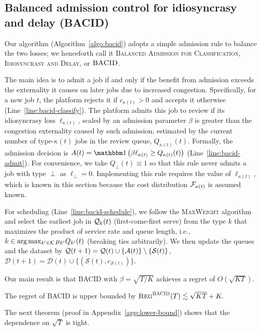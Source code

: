 \subsection{Balanced admission control for idiosyncrasy and delay (\textsc{BACID})}
Our algorithm (Algorithm~\ref{algo:bacid}) adopts a simple admission rule to balance the two losses; we henceforth call it \textsc{Balanced Admission for Classification, Idiosyncrasy and Delay}, or $\textsc{BACID}$.

The main idea is to admit a job if and only if the benefit from admission exceeds the externality it causes on later jobs due to increased congestion. Specifically, for a new job $t$, the platform rejects it if $c_{\kappa(t)} > 0$ and accepts it otherwise (Line~\ref{line:bacid-classify}). The platform admits this job to review if its idiosyncrasy loss $\ell_{\kappa(t)}$, scaled by an admission parameter $\beta$ is greater than the congestion externality caused by such admission, estimated by the current number of type-$\kappa(t)$ jobs in the review queue, $Q_{\kappa(t)}(t)$. Formally, the admission decision is $A(t) = \indic{ \beta \ell_{\kappa(t)} \geq Q_{\kappa(t)}(t)}$ (Line~\ref{line:bacid-admit}). For convenience, we take $Q_{\perp}(t) \equiv 1$ so that this rule never admits a job with type $\perp$ as $\ell_{\perp} = 0.$ Implementing this rule requires the value of $\ell_{\kappa(t)}$, which is known in this section because the cost distribution $\mathcal{F}_{\kappa(t)}$ is assumed known. 

For scheduling (Line~\ref{line:bacid-schedule}), we follow the \textsc{MaxWeight} algorithm \citep{tassiulas1992stability} and select the earliest job in $\mathcal{Q}_{k}(t)$ (first-come-first serve) from the type $k$ that maximizes the product of service rate and queue length, i.e., $k \in \arg\max_{k' \in \mathcal{K}} \mu_{k'} Q_{k'}(t)$ (breaking ties arbitrarily). We then update the queues and the dataset by $\mathcal{Q}(t+1) = \mathcal{Q}(t) \cup \{\mathcal{A}(t)\}\setminus \{\mathcal{S}(t)\}$,~$\mathcal{D}(t+1) = \mathcal{D}(t) \cup \{(\mathcal{S}(t), c_{\mathcal{S}(t)})\}$. 



Our main result is that \textsc{BACID} with $\beta = \sqrt{T/K}$ achieves a regret of $O(\sqrt{KT})$.
\begin{theorem}\label{thm:bacid}
The regret of \textsc{BACID} is upper bounded by $\textsc{Reg}^{\textsc{BACID}}(T)\lesssim \sqrt{KT}+K.$
\end{theorem}

The next theorem (proof in Appendix~\ref{app:lower-bound}) shows that the dependence on $\sqrt{T}$ is tight. 

